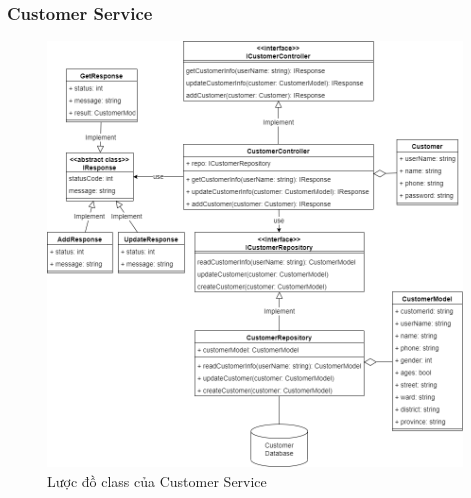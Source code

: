 \subsubsection{Customer Service}
\begin{figure}[!htp]
	\centering
	\includegraphics[width=11cm]{img/Architecture/service/CustomerService.png}
	\newline
	\caption{Lược đồ class của Customer Service}
\end{figure}




